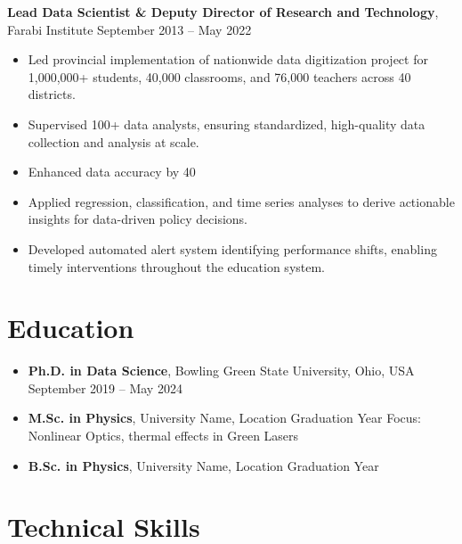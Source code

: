 \documentclass[a4paper,10pt]{article}
\begin{document}
\vspace{4pt}
{\bfseries Lead Data Scientist \& Deputy Director of Research and Technology}, Farabi Institute \hfill September 2013 -- May 2022

\begin{itemize}
    \item Led provincial implementation of nationwide data digitization project for 1,000,000+ students, 40,000 classrooms, and 76,000 teachers across 40 districts.
   
    \item Supervised 100+ data analysts, ensuring standardized, high-quality data collection and analysis at scale.
    
    \item Enhanced data accuracy by 40%
    
    \item Applied regression, classification, and time series analyses to derive actionable insights for data-driven policy decisions.
    
    \item Developed automated alert system identifying performance shifts, enabling timely interventions throughout the education system.
\end{itemize}

\section*{Education}

\begin{itemize}
    \item {\bfseries Ph.D. in Data Science}, Bowling Green State University, Ohio, USA \hfill September 2019 -- May 2024
    
    \item {\bfseries M.Sc. in Physics}, University Name, Location \hfill Graduation Year
    Focus: Nonlinear Optics, thermal effects in Green Lasers
    
    \item {\bfseries B.Sc. in Physics}, University Name, Location \hfill Graduation Year
\end{itemize}

\section*{Technical Skills}
\end{document}
